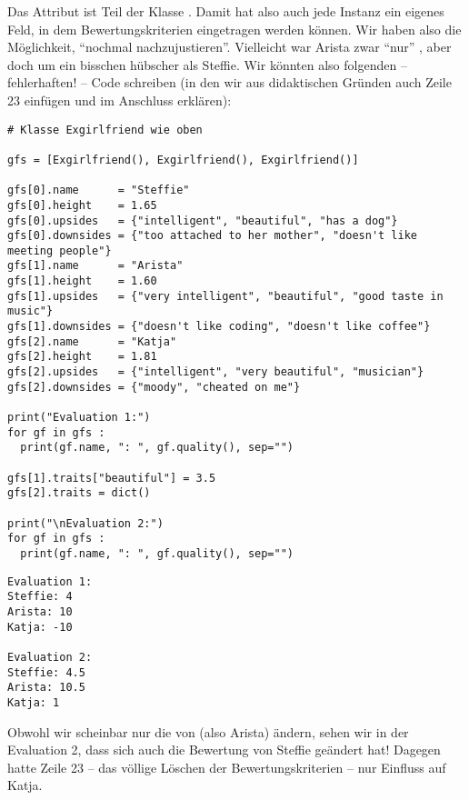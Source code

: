 Das Attribut  ist Teil der Klasse . Damit hat also auch jede Instanz ein eigenes Feld, in dem Bewertungskriterien eingetragen werden können. Wir haben also die Möglichkeit, \enquote{nochmal nachzujustieren}. Vielleicht war Arista zwar \enquote{nur} , aber doch um ein bisschen hübscher als Steffie. Wir könnten also folgenden -- fehlerhaften! -- Code schreiben (in den wir aus didaktischen Gründen auch Zeile 23 einfügen und im Anschluss erklären):
\begin{warnbox}[Beispiel: Versehentliches Ändern von Referenzen, leftupper=7mm]
\begin{verbatim}
# Klasse Exgirlfriend wie oben

gfs = [Exgirlfriend(), Exgirlfriend(), Exgirlfriend()]

gfs[0].name      = "Steffie"
gfs[0].height    = 1.65
gfs[0].upsides   = {"intelligent", "beautiful", "has a dog"}
gfs[0].downsides = {"too attached to her mother", "doesn't like meeting people"}
gfs[1].name      = "Arista"
gfs[1].height    = 1.60
gfs[1].upsides   = {"very intelligent", "beautiful", "good taste in music"}
gfs[1].downsides = {"doesn't like coding", "doesn't like coffee"}
gfs[2].name      = "Katja"
gfs[2].height    = 1.81
gfs[2].upsides   = {"intelligent", "very beautiful", "musician"}
gfs[2].downsides = {"moody", "cheated on me"}

print("Evaluation 1:")
for gf in gfs :
  print(gf.name, ": ", gf.quality(), sep="")

gfs[1].traits["beautiful"] = 3.5
gfs[2].traits = dict()

print("\nEvaluation 2:")
for gf in gfs :
  print(gf.name, ": ", gf.quality(), sep="")
\end{verbatim}

\end{warnbox}
\begin{cmdbox}
\begin{verbatim}
Evaluation 1:
Steffie: 4
Arista: 10
Katja: -10

Evaluation 2:
Steffie: 4.5
Arista: 10.5
Katja: 1
\end{verbatim}
\end{cmdbox}

Obwohl wir scheinbar nur die  von  (also Arista) ändern, sehen wir in der Evaluation 2, dass sich auch die Bewertung von Steffie geändert hat! Dagegen hatte Zeile 23 -- das völlige Löschen der Bewertungskriterien -- nur Einfluss auf Katja.

